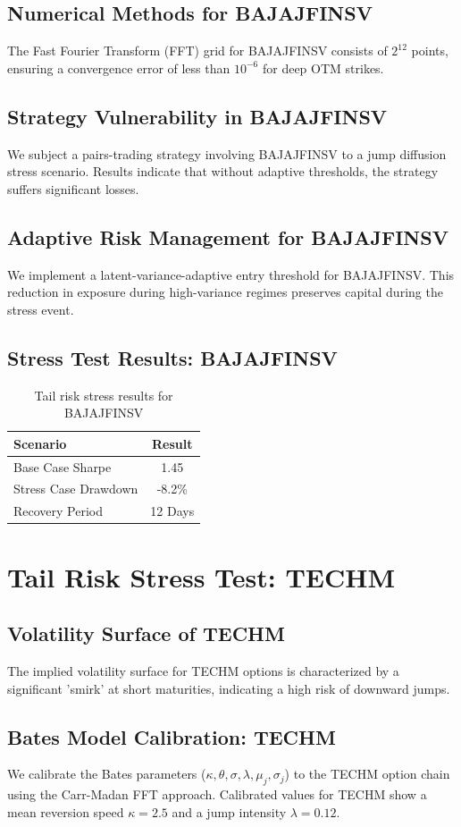 \documentclass[12pt,a4paper,twoside]{article}
\begin{document}
\subsection{Numerical Methods for BAJAJFINSV}
The Fast Fourier Transform (FFT) grid for BAJAJFINSV consists of $2^{12}$ points, ensuring a convergence error of less than $10^{-6}$ for deep OTM strikes.
\subsection{Strategy Vulnerability in BAJAJFINSV}
We subject a pairs-trading strategy involving BAJAJFINSV to a jump diffusion stress scenario. Results indicate that without adaptive thresholds, the strategy suffers significant losses.
\subsection{Adaptive Risk Management for BAJAJFINSV}
We implement a latent-variance-adaptive entry threshold for BAJAJFINSV. This reduction in exposure during high-variance regimes preserves capital during the stress event.
\subsection{Stress Test Results: BAJAJFINSV}
\begin{table}[H]
\centering
\begin{tabular}{|l|c|}
\hline
Scenario & Result \\
\hline
Base Case Sharpe & 1.45 \\
Stress Case Drawdown & -8.2\% \\
Recovery Period & 12 Days \\
\hline
\end{tabular}
\caption{Tail risk stress results for BAJAJFINSV}
\end{table}
\newpage

\section{Tail Risk Stress Test: TECHM}
\subsection{Volatility Surface of TECHM}
The implied volatility surface for TECHM options is characterized by a significant 'smirk' at short maturities, indicating a high risk of downward jumps.
\subsection{Bates Model Calibration: TECHM}
We calibrate the Bates parameters ($\kappa, \theta, \sigma, \lambda, \mu_j, \sigma_j$) to the TECHM option chain using the Carr-Madan FFT approach.
Calibrated values for TECHM show a mean reversion speed $\kappa = 2.5$ and a jump intensity $\lambda = 0.12$.
\end{document}
